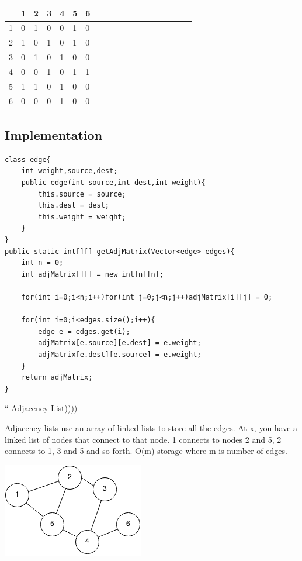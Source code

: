 \documentclass[11pt,oneside]{book}
\makeatletter
\def\maxwidth#1{\ifdim\Gin@nat@width>#1 #1\else\Gin@nat@width\fi}
\makeatother
\begin{document}
\vspace{10pt} \begin{tabulary}{0.4\linewidth}{|l|l|l|l|l|l|l|l|l|l|l|l|l|l|l|l|l|l|l}\hline


   &
  1 &
  2 &
  3 &
  4 &
  5 &
  6\\
\hline


  1 &
  0 &
  1 &
  0 &
  0 &
  1 &
  0\\

  2 &
  1 &
  0 &
  1 &
  0 &
  1 &
  0\\

  3 &
  0 &
  1 &
  0 &
  1 &
  0 &
  0\\

  4 &
  0 &
  0 &
  1 &
  0 &
  1 &
  1\\

  5 &
  1 &
  1 &
  0 &
  1 &
  0 &
  0\\

  6 &
  0 &
  0 &
  0 &
  1 &
  0 &
  0\\

\hline\end{tabulary}

\subsection{Implementation}

\begin{lstlisting}
class edge{
    int weight,source,dest;
    public edge(int source,int dest,int weight){
        this.source = source;
        this.dest = dest;
        this.weight = weight;
    }
}
public static int[][] getAdjMatrix(Vector<edge> edges){
    int n = 0;
    int adjMatrix[][] = new int[n][n];
    
    for(int i=0;i<n;i++)for(int j=0;j<n;j++)adjMatrix[i][j] = 0;
    
    for(int i=0;i<edges.size();i++){
        edge e = edges.get(i);
        adjMatrix[e.source][e.dest] = e.weight;
        adjMatrix[e.dest][e.source] = e.weight;
    }
    return adjMatrix;
}
\end{lstlisting}

        `` Adjacency List))))
        

Adjacency lists use an array of linked lists to store all the edges. At x, you have a linked list of nodes that connect to 
that node. 1 connects to nodes 2 and 5, 2 connects to 1, 3 and 5 and so forth. O(m) storage where m is number of edges.

\includegraphics[width=\maxwidth{\textwidth}]{graph.png}
\end{document}
